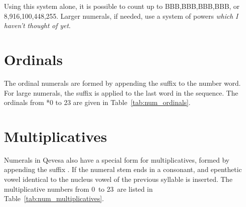\documentclass[grammar]{subfiles}
\begin{document}
  Using this system alone, it is possible to count up to BBB,BBB,BBB,BBB\duo, or 8,916,100,448,255\dec. Larger numerals, if needed, use a system of powers \emph{which I haven't thought of yet}.

  \section{Ordinals}
  \label{sec:num_ordinals}

  The ordinal numerals are formed by appending the suffix  to the number word. For large numerals, the suffix is applied to the last word in the sequence. The ordinals from *0 to 23\dec{} are given in Table~\ref{tab:num_ordinals}.

  \begin{table}[htpb]\small\capstart
      \qquad
      \caption{Ordinal numerals from 0\dec\ to 23\dec\label{tab:num_ordinals}}
  \end{table}

  \section{Multiplicatives}
  \label{sec:num_multiplicatives}

  Numerals in Qevesa also have a special form for multiplicatives, formed by appending the suffix . If the numeral stem ends in a consonant, and epenthetic vowel identical to the nucleus vowel of the previous syllable is inserted. The multiplicative numbers from 0\dec\ to 23\dec\ are listed in Table~\ref{tab:num_multiplicatives}.
\end{document}
